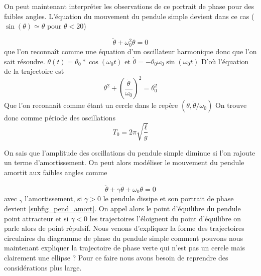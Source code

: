 \documentclass{article}
\begin{document}
On peut maintenant interpréter les observations de ce portrait de phase pour des faibles angles. L'équation du mouvement du pendule simple devient dans ce cas ($\sin(\theta)\simeq \theta$ pour $\theta<20$)

\begin{equation}
    \ddot{\theta} + \omega_0^2\theta=0
\end{equation}
que l'on reconnaît comme une équation d'un oscillateur harmonique donc que l'on sait résoudre. 
$\theta (t) = \theta_0*\cos(\omega_0 t)$
et $\dot\theta= -\theta_0 \omega_0 \sin(\omega_0 t)$
D'où l'équation de la trajectoire est 
\begin{equation}
    \theta^2+\left(\frac{\dot\theta}{\omega_0}\right)^2 =\theta_0^2
\end{equation}
Que l'on reconnait comme étant un cercle dans le repère $\left(\theta, \dot\theta/\omega_0\right)$
On trouve donc comme période des oscillations $$T_0 = 2\pi \sqrt{\frac{\ell}{g}}$$

On sais que l'amplitude des oscillations du pendule simple diminue si l'on rajoute un terme d'amortissement. On peut alors modéliser le mouvement du pendule amortit aux faibles angles comme 

\begin{equation}
    \ddot\theta + \gamma \dot{\theta} + \omega_0 \theta=0
    \label{pend_ammort}
\end{equation}
avec $_\gamma$ l'amortissement, si $\gamma>0$ le pendule dissipe et son portrait de phase devient \ref{subfig_pend_amort}. On appel alors le point d'équilibre du pendule point attracteur et si $\gamma <0 $ les trajectoires l'éloignent du point d'équilibre on parle alors de point répulsif. 
Nous venons d'expliquer la forme des trajectoires circulaires du diagramme de phase du pendule simple comment pouvons nous maintenant expliquer la trajectoire de phase verte qui n'est pas un cercle mais clairement une ellipse ? Pour ce faire nous avons besoin de reprendre des considérations plus large.
\end{document}
